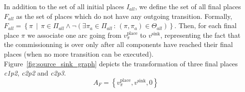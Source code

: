 In addition to the set of all initial places $I_{all}$, we define
the set of all final places $F_{all}$ as the set of places which
do not have any outgoing transition. Formally,
$F_{all}=\left\{ \pi\,\mid\,\pi\in\Pi_{all}\land\lnot\left(\exists\pi_{a}\in\Pi_{all}\,:\,\left(\pi,\pi_{a}\right)\in\Theta_{all}\right)\right\} $.
Then, for each final place $\pi$ we associate one arc going from
$v_\pi^\text{place}$ to $v^\text{sink}$, representing the fact that the
commissionning is over only after all components have reached their final places
(\ie when no more transition can be executed).
Figure~\ref{fig:source_sink_graph} depicts the transformation of three final
places \emph{c1p2}, \emph{c2p2} and \emph{c2p3}.
\[
A_{F}=\left\{ v_\pi^\text{place},v^\text{sink},0\right\} 
\]

\begin{figure}[h]
  \hfill
\end{figure}
